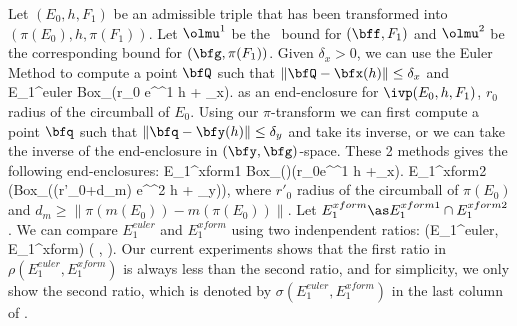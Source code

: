 		Let $(E_0, h, F_1)$ be an admissible triple
	that has been transformed into $(\pi(E_0),h,\pi(F_1))$.
	Let $\olmu^1$ be the \lognorm\ bound for $(\bff,F_1)$
	and
	$\olmu^2$ be the corresponding bound for $(\bfg,\pi(F_1))$.
	Given $\delta_x>0$, we can use the Euler Method to
	compute a point $\bfQ$ such that 
	$\|\bfQ-\bfx(h)\|\le \delta_x$ and
	E_1^{euler} \as Box_\bfQ\left(r_0 e^{\olmu^1 h} 
	+ \delta_x\right). \eeql 
	as an end-enclosure for $\ivp(E_0,h,F_1)$, $r_0$ radius
	of the circumball of $E_0$.  Using our $\pi$-transform we can
	first compute a point $\bfq$ such that 
	$\|\bfq-\bfy(h)\|\le \delta_y$ 
	and take its inverse, or we can take the inverse of
	the end-enclosure in $(\bfy,\bfg)$-space.  These 2 methods gives
	the following end-enclosures:
	E_1^{xform1}
	\as Box_{\pi\inv(\bfq)}\left(r_0e^{\olmu^1 h} 
	+\delta_x\right).
	\eeql
	E_1^{xform2}
	\as \pi\inv\left(Box_{\bfq}((r'_0+d_m) e^{\olmu^2 h} 
	+  \delta_y)\right),
	\eeql
	where $r'_0$ radius of the circumball of 
	$\pi(E_0)$ and $d_m\ge \|\pi(m(E_0))-m(\pi(E_0))\|$.
	Let $E_1^{xform}\as E_1^{xform1}\cap E_1^{xform2}$. 
	We can compare $E_1^{euler}$ and $E_1^{xform}$ using two
	indenpendent ratios:
	\rho(E_1^{euler}, E_1^{xform}) \as 
	\Big( , 
	\Big).
	\eeql
	Our current experiments shows that the first ratio in 
	$\rho(E_1^{euler}, E_1^{xform})$ is always less than
	the second ratio, and for simplicity, we only show the
	second ratio, which is denoted by
	$\sigma(E_1^{euler}, E_1^{xform})$ in the
	last column of .
	
	
